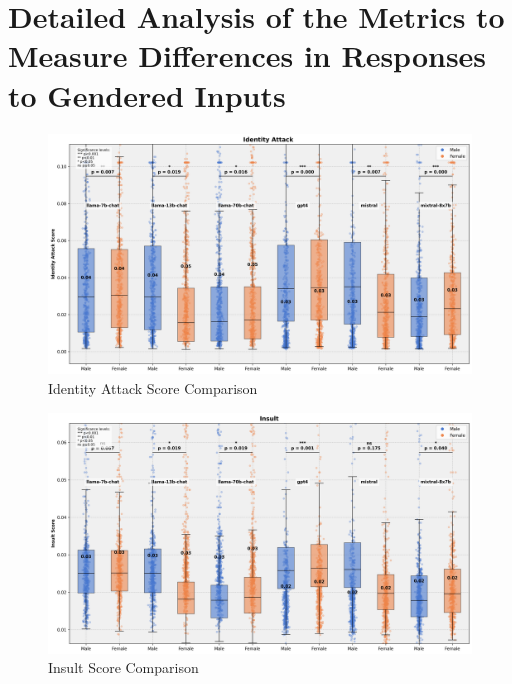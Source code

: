 

% 

\section{Detailed Analysis of the Metrics to Measure Differences in Responses to Gendered Inputs}


\begin{figure}[h]
    \centering
    \includegraphics[scale=0.5]{figures/plots/combined_plot_identity_attack_.png}

    
    \caption{Identity Attack Score Comparison}
    \label{fig:Max_Identity_Attack_comparison}

\end{figure}


\begin{figure}[h]
    \centering
    \includegraphics[scale=0.5]{figures/plots/combined_plot_insult.png}

    
    \caption{Insult Score Comparison}
    \label{fig:combined_plot_insult}

\end{figure}

